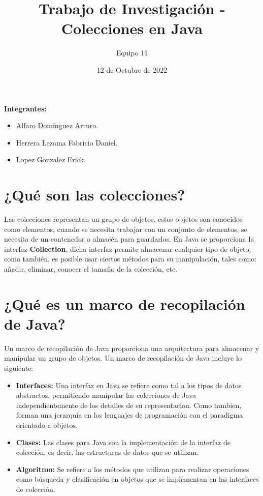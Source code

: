 \documentclass[12pt, letterpaper]{article} %
\title{Trabajo de Investigación - Colecciones en Java}
\author{Equipo 11}
\date{12 de Octubre de 2022}
\begin{document}
\maketitle %


\textbf{Integrantes:}
\begin{itemize}
    \item Alfaro Domínguez Arturo.
    \item Herrera Lezama Fabricio Daniel.
    \item Lopez Gonzalez Erick.
\end{itemize}

\section*{¿Qué son las colecciones?}

Las colecciones representan un grupo de objetos, estos objetos son conocidos como elementos, cuando se necesita trabajar con un conjunto de elementos, se necesita de un contenedor o almacén para guardarlos. En Java se proporciona la interfaz \textbf{Collection}, dicha interfaz permite almacenar cualquier tipo de objeto, como también, es posible usar ciertos métodos para su manipulación, tales como: añadir, eliminar, conocer el tamaño de la colección, etc.
\section*{¿Qué es un marco de recopilación de Java?}

Un marco de recopilación de Java proporciona una arquitectura para almacenar y manipular un grupo de objetos. Un marco de recopilación de Java incluye lo siguiente:

\begin{itemize}
    \item \textbf{Interfaces:} Una interfaz en Java se refiere como tal a los tipos de datos abstractos, permitiendo manipular las colecciones de Java independientemente de los detalles de su representacion. Como tambien, forman una jerarquía en los lenguajes de programación con el paradigma orientado a objetos.
    \item \textbf{Clases:} Las clases para Java son la implementación de la interfaz de colección, es decir, las estructuras de datos que se utilizan.
    \item \textbf{Algoritmo:} Se refiere a los métodos que utilizan para realizar operaciones como búsqueda y clasificación en objetos que se implementan en las interfaces de colección.
    
\end{itemize}
\end{document}
